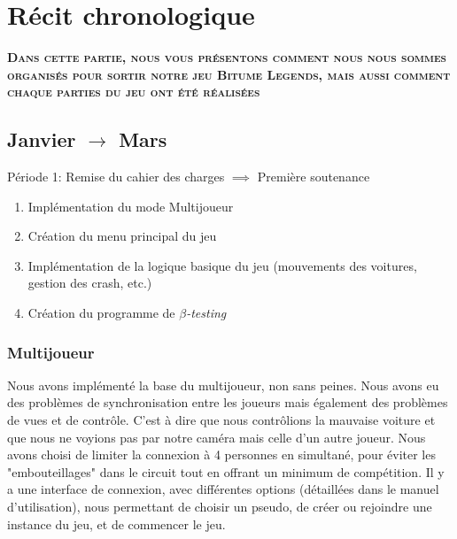 \documentclass[a4paper,12pt]{article}
\begin{document}
    \section{Récit chronologique}
    \textbf{\textsc{Dans cette partie, nous vous présentons comment nous nous sommes organisés pour sortir notre jeu Bitume Legends, mais aussi comment chaque parties du jeu ont été réalisées}}
        \subsection{Janvier $\to$ Mars}
        
        
        
        \begin{description}
    \item Période 1: Remise du cahier des charges \(\implies\) Première soutenance
        \begin{enumerate}
            \item Implémentation du mode Multijoueur
            \item Création du menu principal du jeu
            \item Implémentation de la logique basique du jeu (mouvements des voitures, gestion des crash, etc.)
            \item Création du programme de \(\beta\)\textit{-testing}
                \\
        \end{enumerate}
    \end{description}
        
            \subsubsection{Multijoueur}
                Nous avons implémenté la base du multijoueur, non sans peines. Nous avons eu des problèmes de 
                synchronisation entre les joueurs mais également des problèmes de vues et de contrôle. C'est à dire 
                que nous contrôlions la mauvaise voiture et que nous ne voyions pas par notre caméra mais celle d'un 
                autre joueur. 
                Nous avons choisi de limiter la connexion à 4 personnes en simultané, pour éviter les 
                "embouteillages" dans le circuit tout en offrant un minimum de compétition. Il y a une interface de 
                connexion, avec différentes options (détaillées dans le manuel d'utilisation), nous permettant de 
                choisir un pseudo, de créer ou rejoindre une instance du jeu, et de commencer le jeu.
  
\end{document}
